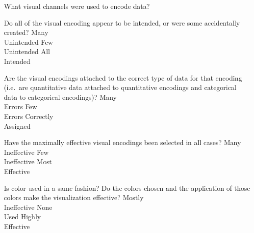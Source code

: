 \documentclass[a4paper,12pt]{article}
\begin{document}
	{What visual channels were used to encode data? }
    { 
    }
        
	{Do all of the visual encoding appear to be intended, or were some accidentally created?}
        {\choice Many\\Unintended}
        {\choice Few\\Unintended}
        {\choice All\\Intended} 
        
	{Are the visual encodings attached to the correct type of data for that 
    	encoding (i.e.\ are quantitative data attached to quantitative 
        encodings and categorical data to categorical encodings)?}
    {\choice Many\\Errors}
    {\choice Few\\Errors}
    {\choice Correctly\\Assigned} 
            
	{Have the maximally effective visual encodings been selected in all cases? }
    {\choice Many\\Ineffective}
    {\choice Few\\Ineffective}
    {\choice Most\\Effective} 
        
	{Is color used in a same fashion? Do the colors chosen and the application 
    	of those colors make the visualization effective?}
    {\choice Mostly\\Ineffective}
    {\choice None\\Used}
    {\choice Highly\\Effective} 
\end{document}
